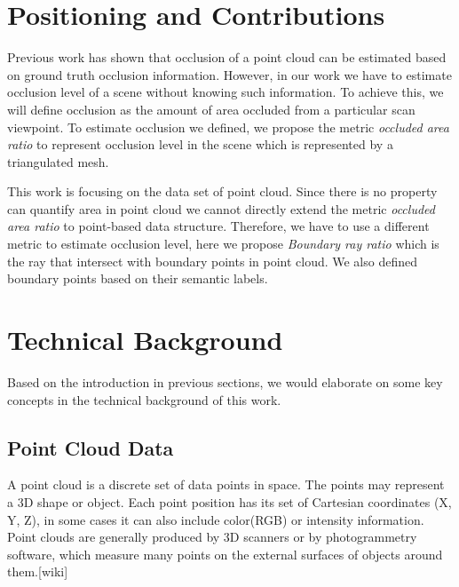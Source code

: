\documentclass[11pt, a4paper,oneside,chapterprefix=false]{scrbook}
\begin{document}
\section{Positioning and Contributions}

Previous work has shown that occlusion of a point cloud can be estimated based on ground truth occlusion information. However, in our work we have to estimate occlusion level of a scene without knowing such information. To achieve this, we will define occlusion as the amount of area occluded from a particular scan viewpoint. To estimate occlusion we defined, we propose the metric \emph{occluded area ratio} to represent occlusion level in the scene which is represented by a triangulated mesh. 

\vspace{10pt}

This work is focusing on the data set of point cloud. Since there is no property can quantify area in point cloud we cannot directly extend the metric \emph{occluded area ratio} to point-based data structure. Therefore, we have to use a different metric to estimate occlusion level, here we propose \emph{Boundary ray ratio} which is the ray that intersect with boundary points in point cloud. We also defined boundary points based on their semantic labels.

\section{Technical Background}

Based on the introduction in previous sections, we would elaborate on some key concepts in the technical background of this work.

\subsection{Point Cloud Data}

A point cloud is a discrete set of data points in space. The points may represent a 3D shape or object. Each point position has its set of Cartesian coordinates (X, Y, Z), in some cases it can also include color(RGB) or intensity information. Point clouds are generally produced by 3D scanners or by photogrammetry software, which measure many points on the external surfaces of objects around them.[wiki] 

\vspace{10pt}
\end{document}
